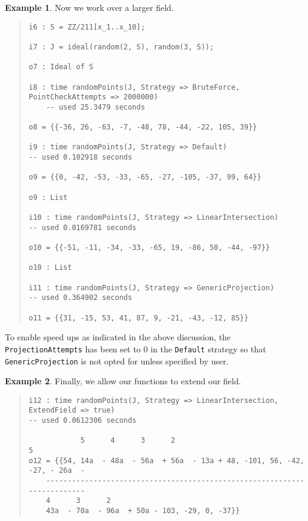 \documentclass[11pt]{amsart}
\theoremstyle{definition}
\newtheorem{example}{Example}[section]
\begin{document}
\begin{example}
    Now we work over a larger field.
    {{\small\color{blue}
    \begin{quote}
\begin{verbatim}
i6 : S = ZZ/211[x_1..x_10];

i7 : J = ideal(random(2, S), random(3, S));

o7 : Ideal of S

i8 : time randomPoints(J, Strategy => BruteForce, PointCheckAttempts => 2000000)
    -- used 25.3479 seconds
    
o8 = {{-36, 26, -63, -7, -48, 78, -44, -22, 105, 39}}

i9 : time randomPoints(J, Strategy => Default)
-- used 0.102918 seconds

o9 = {{0, -42, -53, -33, -65, -27, -105, -37, 99, 64}}

o9 : List

i10 : time randomPoints(J, Strategy => LinearIntersection)
-- used 0.0169781 seconds

o10 = {{-51, -11, -34, -33, -65, 19, -86, 50, -44, -97}}

o10 : List

i11 : time randomPoints(J, Strategy => GenericProjection)
-- used 0.364902 seconds

o11 = {{31, -15, 53, 41, 87, 9, -21, -43, -12, 85}}      
    \end{verbatim}
\end{quote}\vspace{-1em}
        }}
    \end{example}
To enable speed ups as indicated in the above discussion, the {\tt ProjectionAttempts} has been set to $0$ in the {\tt Default} strategy so that {\tt GenericProjection} is not opted for unless specified by user.


    \begin{example}
        Finally, we allow our functions to extend our field.
        {{\small\color{blue}
        \begin{quote}
        \begin{verbatim}
i12 : time randomPoints(J, Strategy => LinearIntersection, ExtendField => true)
-- used 0.0612306 seconds

            5      4      3      2                                      5  
o12 = {{54, 14a  - 48a  - 56a  + 56a  - 13a + 48, -101, 56, -42, -27, - 26a  -
    -------------------------------------------------------------------------
    4      3      2
    43a  - 70a  - 96a  + 50a - 103, -29, 0, -37}}
        \end{verbatim}
    \end{quote}
        }}
    \end{example}
\end{document}

